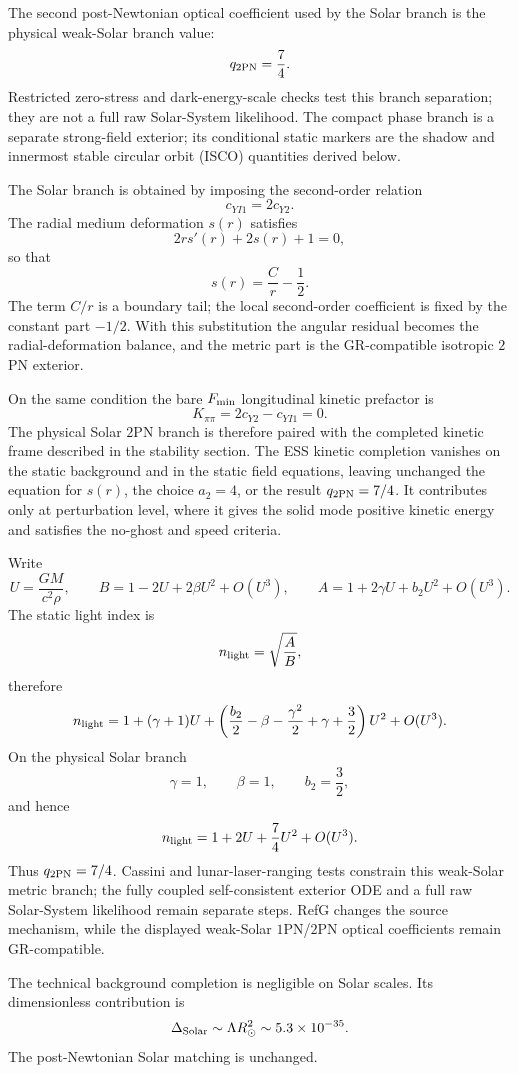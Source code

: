 \documentclass[12pt,a4paper]{article}
\begin{document}
The second post-Newtonian optical coefficient used by the Solar branch is the
physical weak-Solar branch value:
\[
q_{2{\rm PN}}=\frac{7}{4}.
\]
Restricted zero-stress and dark-energy-scale checks test this branch separation;
they are not a full raw Solar-System likelihood. The compact phase branch is a
separate strong-field exterior; its conditional static markers are the shadow
and innermost stable circular orbit (ISCO) quantities derived below.

The Solar branch is obtained by imposing the second-order relation
\[
c_{YI1}=2c_{Y2}.
\]
The radial medium deformation $s(r)$ satisfies
\[
2rs'(r)+2s(r)+1=0,
\]
so that
\[
s(r)=\frac{C}{r}-\frac12.
\]
The term $C/r$ is a boundary tail; the local second-order coefficient is fixed by the constant part $-1/2$. With this substitution the angular residual becomes the radial-deformation balance, and the metric part is the GR-compatible isotropic $2$PN exterior.

On the same condition the bare $F_{\rm min}$ longitudinal kinetic prefactor is
\[
K_{\pi\pi}=2c_{Y2}-c_{YI1}=0.
\]
The physical Solar $2$PN branch is therefore paired with the completed kinetic
frame described in the stability section. The ESS kinetic completion vanishes
on the static background and in the static field equations, leaving unchanged
the equation for $s(r)$, the choice $a_2=4$, or the result
$q_{2{\rm PN}}=7/4$. It contributes only at perturbation level, where it gives
the solid mode positive kinetic energy and satisfies the no-ghost and speed criteria.

Write
\[
U=\frac{GM}{c^2\rho},
\qquad
B=1-2U+2\beta U^2+O(U^3),
\qquad
A=1+2\gamma U+b_2U^2+O(U^3).
\]
The static light index is
\[
n_{\rm light}=\sqrt{\frac{A}{B}},
\]
therefore
\[
n_{\rm light}=1+(\gamma+1)U+
\left(\frac{b_2}{2}-\beta-\frac{\gamma^2}{2}
+\gamma+\frac32\right)U^2+O(U^3).
\]
On the physical Solar branch
\[
\gamma=1,\qquad \beta=1,\qquad b_2=\frac32,
\]
and hence
\[
n_{\rm light}=1+2U+\frac74U^2+O(U^3).
\]
Thus $q_{2{\rm PN}}=7/4$. Cassini and lunar-laser-ranging tests constrain this
weak-Solar metric branch; the fully coupled self-consistent exterior ODE and a
full raw Solar-System likelihood remain separate steps. RefG changes the source
mechanism, while the displayed weak-Solar $1$PN/$2$PN optical coefficients remain
GR-compatible.

The technical background completion is negligible on Solar scales. Its dimensionless contribution is
\[
\Delta_{\rm Solar}\sim \Lambda R_\odot^2\sim 5.3\times10^{-35}.
\]
The post-Newtonian Solar matching is unchanged.
\end{document}
